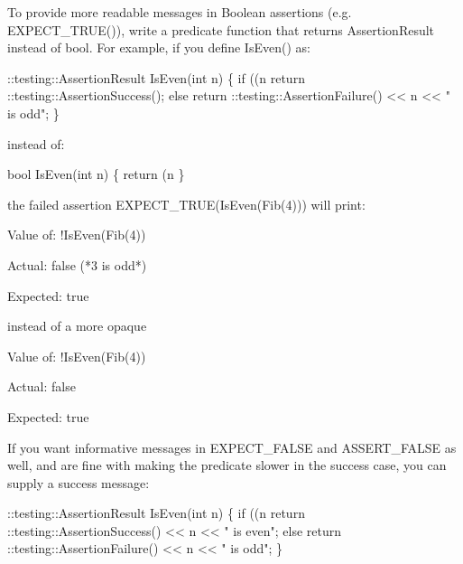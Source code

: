 To provide more readable messages in Boolean assertions (e.\+g. {\ttfamily E\+X\+P\+E\+C\+T\+\_\+\+T\+R\+U\+E()}), write a predicate function that returns {\ttfamily Assertion\+Result} instead of {\ttfamily bool}. For example, if you define {\ttfamily Is\+Even()} as\+:


\begin{DoxyCode}
::testing::AssertionResult IsEven(int n) \{
  if ((n %
    return ::testing::AssertionSuccess();
  else
    return ::testing::AssertionFailure() << n << " is odd";
\}
\end{DoxyCode}


instead of\+:


\begin{DoxyCode}
bool IsEven(int n) \{
  return (n %
\}
\end{DoxyCode}


the failed assertion {\ttfamily E\+X\+P\+E\+C\+T\+\_\+\+T\+R\+UE(Is\+Even(\+Fib(4)))} will print\+:


\begin{DoxyPre}
Value of: !IsEven(Fib(4))~\newline

Actual: false (*3 is odd*)~\newline

Expected: true~\newline

\end{DoxyPre}


instead of a more opaque


\begin{DoxyPre}
Value of: !IsEven(Fib(4))~\newline

Actual: false~\newline

Expected: true~\newline

\end{DoxyPre}


If you want informative messages in {\ttfamily E\+X\+P\+E\+C\+T\+\_\+\+F\+A\+L\+SE} and {\ttfamily A\+S\+S\+E\+R\+T\+\_\+\+F\+A\+L\+SE} as well, and are fine with making the predicate slower in the success case, you can supply a success message\+:


\begin{DoxyCode}
::testing::AssertionResult IsEven(int n) \{
  if ((n %
    return ::testing::AssertionSuccess() << n << " is even";
  else
    return ::testing::AssertionFailure() << n << " is odd";
\}
\end{DoxyCode}


